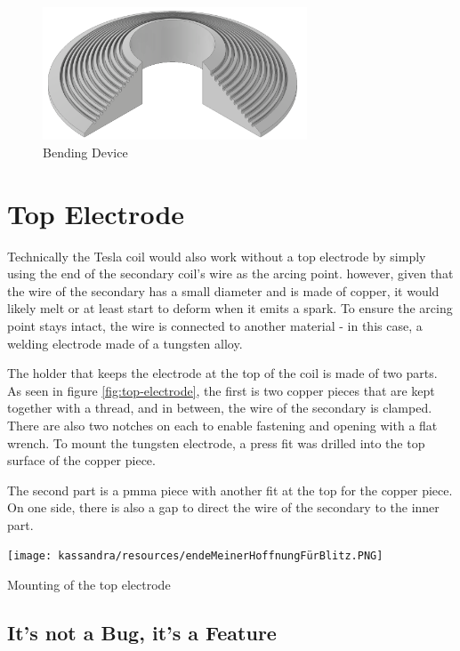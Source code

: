 \begin{figure}[h!]
    \centering
    \includegraphics[width=0.7\textwidth]{kassandra/resources/JerJerWoBistDuBiegeBieg.PNG}
    \caption{Bending Device}
    \label{fig:biegbieg}
\end{figure}

\section{Top Electrode}

Technically the Tesla coil would also work without a top electrode by simply using the end of the secondary coil's wire as the arcing point. however, given that the wire of the secondary has a small diameter and is made of copper, it would likely melt or at least start to deform when it emits a spark. To ensure the arcing point stays intact, the wire is connected to another material - in this case, a welding electrode made of a tungsten alloy. 

The holder that keeps the electrode at the top of the coil is made of two parts. As seen in figure \ref{fig:top-electrode}, the first is two copper pieces that are kept together with a thread, and in between, the wire of the secondary is clamped. There are also two notches on each to enable fastening and opening with a flat wrench. To mount the tungsten electrode, a press fit was drilled into the top surface of the copper piece. 

The second part is a \gls{pmma} piece with another fit at the top for the copper piece. On one side, there is also a gap to direct the wire of the secondary to the inner part. 

\begin{marginfigure}[-8cm]
    \centering
    \texttt{[image: kassandra/resources/endeMeinerHoffnungFürBlitz.PNG]}
    \caption{Mounting of the top electrode}
    \label{fig:top-electrode}
\end{marginfigure}

\subsection{It's not a Bug, it's a Feature}

